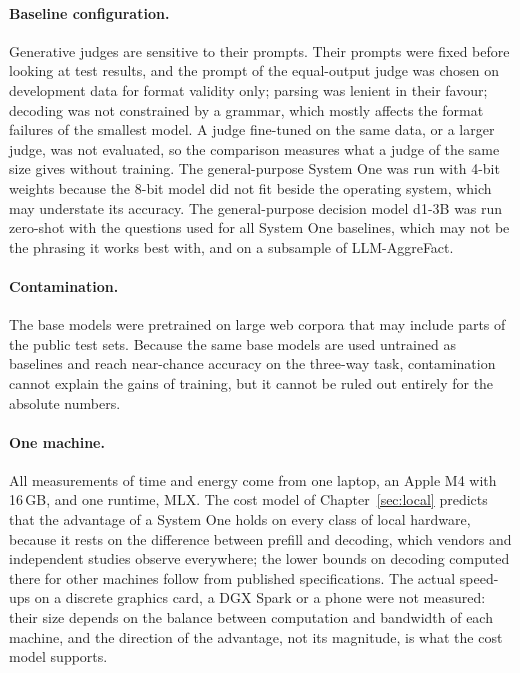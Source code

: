 \paragraph{Baseline configuration.} Generative judges are sensitive to their prompts. Their prompts were fixed before
looking at test results, and the prompt of the equal-output judge was chosen on development data for format validity
only; parsing was lenient in their favour; decoding was not constrained by a grammar, which mostly affects the format
failures of the smallest model. A judge fine-tuned on the same data, or a larger judge, was not evaluated, so the
comparison measures what a judge of the same size gives without training. The general-purpose System One was run with
4-bit weights because the 8-bit model did not fit beside the operating system, which may understate its accuracy. The
general-purpose decision model d1-3B was run zero-shot with the questions used for all System One baselines, which may not
be the phrasing it works best with, and on a subsample of LLM-AggreFact.

\paragraph{Contamination.} The base models were pretrained on large web corpora that may include parts of the public
test sets. Because the same base models are used untrained as baselines and reach near-chance accuracy on the
three-way task, contamination cannot explain the gains of training, but it cannot be ruled out entirely for the absolute
numbers.

\paragraph{One machine.} All measurements of time and energy come from one laptop, an Apple M4 with 16\,GB, and one
runtime, MLX. The cost model of Chapter~\ref{sec:local} predicts that the advantage of a System One holds on every class
of local hardware, because it rests on the difference between prefill and decoding, which vendors and independent studies
observe everywhere; the lower bounds on decoding computed there for other machines follow from published specifications.
The actual speed-ups on a discrete graphics card, a DGX Spark or a phone were not measured: their size depends on the
balance between computation and bandwidth of each machine, and the direction of the advantage, not its magnitude, is
what the cost model supports.

